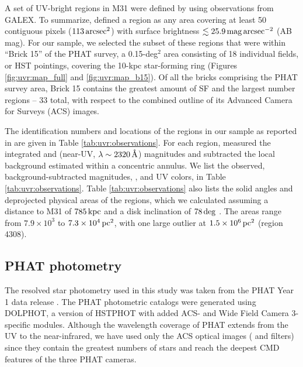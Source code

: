 A set of UV-bright regions in M31 were defined by  using \fuv{}
observations from GALEX. To summarize,  defined a region as
any area covering at least 50 contiguous pixels ($113\,\mathrm{arcsec}^2$) with
\fuv{} surface brightness $\lesssim 25.9\,\mathrm{mag}\,\mathrm{arcsec}^{-2}$ (AB
mag). For our sample, we selected the subset of these regions that were within
``Brick 15'' of the PHAT survey, a 0.15-deg$^2$ area consisting of 18
individual fields, or HST pointings, covering the 10-kpc star-forming ring
(Figures \ref{fig:uvr:map_full} and \ref{fig:uvr:map_b15}). Of all the bricks
comprising the PHAT survey area, Brick 15 contains the greatest amount of SF
and the largest number regions -- 33 total, with respect to the combined
outline of its Advanced Camera for Surveys (ACS) images.

The identification numbers and locations of the regions in our sample as
reported in  are given in Table \ref{tab:uvr:observations}. For
each region,  measured the integrated \fuv{} and \nuv{} (near-UV,
$\lambda \sim 2320\,\textrm{\AA}$) magnitudes and subtracted the local
background estimated within a concentric annulus. We list the observed,
background-subtracted \fuv{} magnitudes, \fuvobs{}, and UV colors,
\fuvnuvobs{} in Table \ref{tab:uvr:observations}. Table
\ref{tab:uvr:observations} also lists the solid angles and deprojected physical
areas of the regions, which we calculated assuming a distance to M31 of
$785\,\mathrm{kpc}$ \citep{McConnachie:2005} and a disk inclination of
$78\,\mathrm{deg}$ \citep{Tully:1994}. The areas range from $7.9 \times 10^3$ to
$7.3 \times 10^4\,\mathrm{pc}^2$, with one large outlier at $1.5 \times
10^6\,\mathrm{pc}^2$ (region 4308).






\subsection{PHAT photometry}\label{uvr:observations.phat}

The resolved star photometry used in this study was taken from the PHAT Year 1
data release \citep{Dalcanton:2012}. The PHAT photometric catalogs were
generated using DOLPHOT, a version of HSTPHOT \citep{Dolphin:2000} with added
ACS- and Wide Field Camera 3-specific modules. Although the wavelength coverage
of PHAT extends from the UV to the near-infrared, we have used only the ACS
optical images (\acsb{} and \acsi{} filters) since they contain the greatest
numbers of stars and reach the deepest CMD features of the three PHAT cameras.

